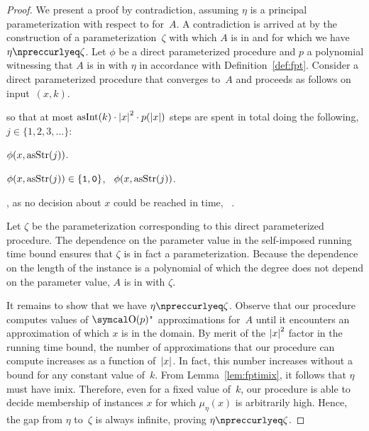\begin{proof}
  We present a proof by contradiction, assuming $\eta$ is a principal parameterization with respect to  for~$A$.
  A contradiction is arrived at by the construction of a parameterization~$\zeta$ with which $A$ is in  and for which we have $\eta \notquasile \zeta$.
  Let $\phi$ be a direct parameterized procedure and $p$ a polynomial witnessing that $A$ is in  with $\eta$ in accordance with Definition~\ref{def:fpt}.
  Consider a direct parameterized procedure that converges to~$A$ and proceeds as follows on input~$(x, k)$.
  \begin{codelisting}
  \item
     so that at most $\asNat(k) \cdot \length{x}^2 \cdot p(\length{x})$ steps are spent in total doing the following,  $j \in \{1, 2, 3, \ldots\}$:
    \begin{codelisting}
    \item
       $\phi(x, \asStr(j))$.
    \item
       $\phi(x, \asStr(j)) \in \{\bits{1}, \bits{0}\}$, ~$\phi(x, \asStr(j))$.
    \end{codelisting}
  \item
    , as no decision about $x$ could be reached in time, ~.
  \end{codelisting}

  Let $\zeta$ be the parameterization corresponding to this direct parameterized procedure.
  The dependence on the parameter value in the self-imposed running time bound ensures that $\zeta$ is in fact a parameterization.
  Because the dependence on the length of the instance is a polynomial of which the degree does not depend on the parameter value, $A$ is in  with $\zeta$.

  It remains to show that we have $\eta \notquasile \zeta$.
  Observe that our procedure computes values of $\bigO(p)$"~approximations for~$A$ until it encounters an approximation of which $x$ is in the domain.
  By merit of the ${\lvert x\rvert}^2$ factor in the running time bound, the number of approximations that our procedure can compute increases as a function of~${\lvert x\rvert}$.
  In fact, this number increases without a bound for any constant value of~$k$.
  From Lemma~\ref{lem:fptimix}, it follows that $\eta$ must have imix.
  Therefore, even for a fixed value of~$k$, our procedure is able to decide membership of instances $x$ for which $\mu_\eta(x)$ is arbitrarily high.
  Hence, the gap from $\eta$ to~$\zeta$ is always infinite, proving $\eta \notquasile \zeta$.
\end{proof}
%


